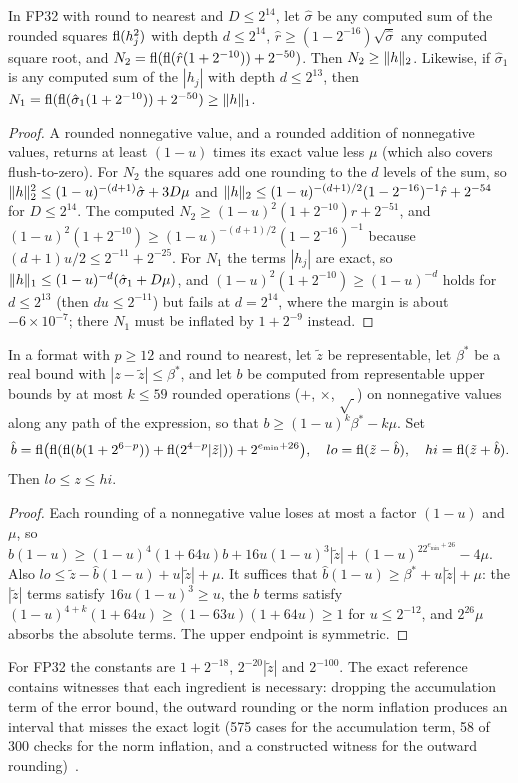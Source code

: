 \begin{lemma}\label{lem:norms}
In FP32 with round to nearest and $D\le2^{14}$, let $\hat\sigma$ be any computed sum of the rounded squares $\operatorname{fl}(h_j^2)$ with depth $d\le2^{14}$, $\hat r\ge(1-2^{-16})\sqrt{\hat\sigma}$ any computed square root, and $N_2=\operatorname{fl}(\operatorname{fl}(\hat r(1+2^{-10}))+2^{-50})$. Then $N_2\ge\lVert h\rVert_2$. Likewise, if $\hat\sigma_1$ is any computed sum of the $|h_j|$ with depth $d\le2^{13}$, then $N_1=\operatorname{fl}(\operatorname{fl}(\hat\sigma_1(1+2^{-10}))+2^{-50})\ge\lVert h\rVert_1$.
\end{lemma}
\begin{proof}
A rounded nonnegative value, and a rounded addition of nonnegative values, returns at least $(1-u)$ times its exact value less $\mu$ (which also covers flush-to-zero). For $N_2$ the squares add one rounding to the $d$ levels of the sum, so $\lVert h\rVert_2^2\le(1-u)^{-(d+1)}\hat\sigma+3D\mu$ and $\lVert h\rVert_2\le(1-u)^{-(d+1)/2}(1-2^{-16})^{-1}\hat r+2^{-54}$ for $D\le2^{14}$. The computed $N_2\ge(1-u)^2(1+2^{-10})\hat r+2^{-51}$, and $(1-u)^2(1+2^{-10})\ge(1-u)^{-(d+1)/2}(1-2^{-16})^{-1}$ because $(d+1)u/2\le2^{-11}+2^{-25}$. For $N_1$ the terms $|h_j|$ are exact, so $\lVert h\rVert_1\le(1-u)^{-d}(\hat\sigma_1+D\mu)$, and $(1-u)^2(1+2^{-10})\ge(1-u)^{-d}$ holds for $d\le2^{13}$ (then $du\le2^{-11}$) but fails at $d=2^{14}$, where the margin is about $-6\times10^{-7}$; there $N_1$ must be inflated by $1+2^{-9}$ instead.
\end{proof}

\begin{lemma}\label{lem:outward}
In a format with $p\ge12$ and round to nearest, let $\tilde z$ be representable, let $\beta^\ast$ be a real bound with $|z-\tilde z|\le\beta^\ast$, and let $b$ be computed from representable upper bounds by at most $k\le59$ rounded operations ($+$, $\times$, $\sqrt{\ }$) on nonnegative values along any path of the expression, so that $b\ge(1-u)^k\beta^\ast-k\mu$. Set
\[\hat b=\operatorname{fl}\bigl(\operatorname{fl}(\operatorname{fl}(b(1+2^{6-p}))+\operatorname{fl}(2^{4-p}|\tilde z|))+2^{e_{\min}+26}\bigr),\quad lo=\operatorname{fl}(\tilde z-\hat b),\quad hi=\operatorname{fl}(\tilde z+\hat b).\]
Then $lo\le z\le hi$.
\end{lemma}
\begin{proof}
Each rounding of a nonnegative value loses at most a factor $(1-u)$ and $\mu$, so $\hat b(1-u)\ge(1-u)^4(1+64u)b+16u(1-u)^3|\tilde z|+(1-u)^22^{e_{\min}+26}-4\mu$. Also $lo\le\tilde z-\hat b(1-u)+u|\tilde z|+\mu$. It suffices that $\hat b(1-u)\ge\beta^\ast+u|\tilde z|+\mu$: the $|\tilde z|$ terms satisfy $16u(1-u)^3\ge u$, the $b$ terms satisfy $(1-u)^{4+k}(1+64u)\ge(1-63u)(1+64u)\ge1$ for $u\le2^{-12}$, and $2^{26}\mu$ absorbs the absolute terms. The upper endpoint is symmetric.
\end{proof}
For FP32 the constants are $1+2^{-18}$, $2^{-20}|\tilde z|$ and $2^{-100}$. The exact reference contains witnesses that each ingredient is necessary: dropping the accumulation term of the error bound, the outward rounding or the norm inflation produces an interval that misses the exact logit (575 cases for the accumulation term, 58 of 300 checks for the norm inflation, and a constructed witness for the outward rounding)~.

